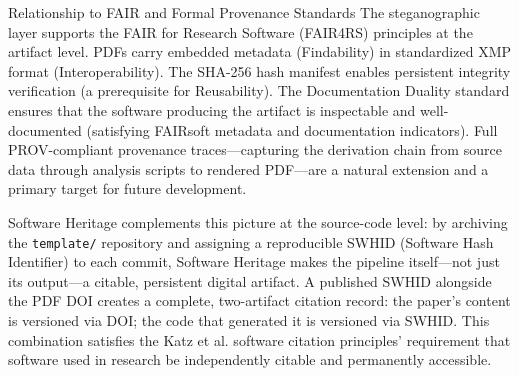 \documentclass[
  ignorenonframetext,
]{beamer}
\begin{document}
\begin{frame}{Relationship to FAIR and Formal
Provenance Standards}
\protect{}\label{relationship-to-fair-and-formal-provenance-standards}
The steganographic layer supports the FAIR for Research Software
(FAIR4RS) principles  at the artifact level.
PDFs carry embedded metadata (Findability) in standardized XMP format
(Interoperability). The SHA-256 hash manifest enables persistent
integrity verification (a prerequisite for Reusability). The
Documentation Duality standard ensures that the software producing the
artifact is inspectable and well-documented (satisfying FAIRsoft
 metadata and documentation indicators). Full
PROV-compliant provenance traces---capturing the derivation chain from
source data through analysis scripts to rendered PDF---are a natural
extension and a primary target for future development.

Software Heritage  complements this
picture at the source-code level: by archiving the \texttt{template/}
repository and assigning a reproducible SWHID (Software Hash Identifier)
to each commit, Software Heritage makes the pipeline itself---not just
its output---a citable, persistent digital artifact. A published SWHID
alongside the PDF DOI creates a complete, two-artifact citation record:
the paper's content is versioned via DOI; the code that generated it is
versioned via SWHID. This combination satisfies the Katz et al.
 software citation principles' requirement that
software used in research be independently citable and permanently
accessible.
\end{frame}
\end{document}
